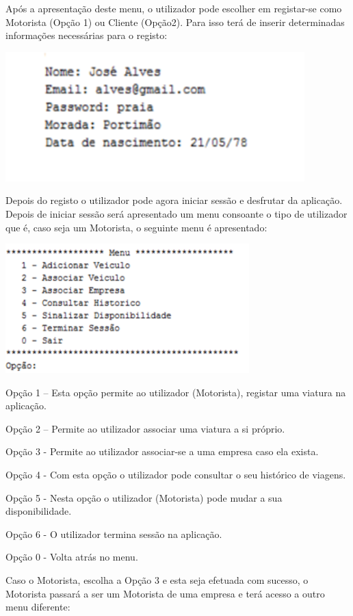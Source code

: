 \documentclass[12pt,a4paper]{report}
\begin{document}
Após a apresentação deste menu, o utilizador pode escolher em registar-se como Motorista (Opção 1) ou Cliente (Opção2). Para isso terá de inserir determinadas informações necessárias para o registo: 

\includegraphics[width=0.7\linewidth, height=5cm]{3.png}

Depois do registo o utilizador pode agora iniciar sessão e desfrutar da aplicação. Depois de iniciar sessão será apresentado um menu consoante o tipo de utilizador que é, caso seja um Motorista, o seguinte menu é apresentado: 

\includegraphics[width=0.7\linewidth, height=5cm]{4.png}

Opção 1 –  Esta opção permite ao utilizador (Motorista), registar uma viatura na aplicação.

Opção 2 – Permite ao utilizador associar uma viatura a si próprio.

Opção 3 -  Permite ao utilizador associar-se a uma empresa caso ela exista.

Opção 4 -  Com esta opção o utilizador pode consultar o seu histórico de viagens.

Opção 5 -  Nesta opção o utilizador (Motorista) pode mudar a sua disponibilidade. 

Opção 6 -  O utilizador termina sessão na aplicação.

Opção 0  - Volta atrás no menu.  

Caso o Motorista, escolha a Opção 3 e esta seja efetuada com sucesso, o Motorista passará a ser um Motorista de uma empresa e terá acesso a outro menu diferente: 
\end{document}
